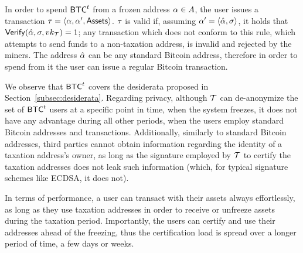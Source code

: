 In order to spend $\mathsf{BTC}^{t}$ from a frozen address $\alpha \in A$, the user
issues a transaction $\tau = \langle \alpha, \alpha', \mathsf{Assets}
\rangle$. $\tau$ is valid if, assuming $\alpha' = \langle
\hat{\alpha}, \sigma \rangle$, it holds that $\mathsf{Verify}(\hat{\alpha}, \sigma,
vk_\mathcal{T}) = 1$; any transaction which does not conform to this rule,
\ie which attempts to send funds to a non-taxation address, is invalid and
rejected by the miners. The address $\hat{\alpha}$ can be any standard
Bitcoin address, therefore in order to spend from it the user can issue a
regular Bitcoin transaction.

We observe that $\mathsf{BTC}^{t}$ covers the desiderata proposed in
Section~\ref{subsec:desiderata}. Regarding privacy, although $\mathcal{T}$ can
de-anonymize the set of $\mathsf{BTC}^{t}$ users at a specific point in time, \ie when the
system freezes, it does not have any advantage during all other periods, when
the users employ standard Bitcoin addresses and transactions. Additionally,
similarly to standard Bitcoin addresses, third parties cannot obtain
information regarding the identity of a taxation address's owner, as long as
the signature employed by $\mathcal{T}$ to certify the taxation addresses does not
leak such information (which, for typical signature schemes like ECDSA, it does
not).

In terms of performance, a user can transact with their assets always
effortlessly, as long as they use taxation addresses in order to receive or
unfreeze assets during the taxation period. Importantly, the users can certify
and use their addresses ahead of the freezing, thus the certification load is
spread over a longer period of time, \eg a few days or weeks.
